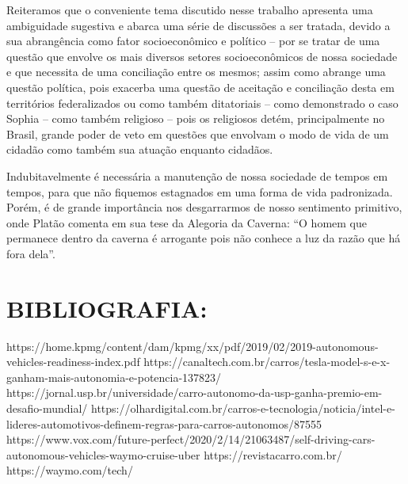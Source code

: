 \documentclass[a4paper, 12pt]{article}
\begin{document}
    Reiteramos que o conveniente tema discutido nesse trabalho apresenta uma ambiguidade sugestiva e abarca uma série de discussões a ser tratada, devido a sua abrangência como fator socioeconômico e político – por se tratar de uma questão que envolve os mais diversos setores socioeconômicos de nossa sociedade e que necessita de uma conciliação entre os mesmos; assim como abrange uma questão política, pois exacerba uma questão de aceitação e conciliação desta em territórios federalizados ou como também ditatoriais – como demonstrado o caso Sophia – como também religioso – pois os religiosos detém, principalmente no Brasil, grande poder de veto em questões que envolvam o modo de vida de um cidadão como também sua atuação enquanto cidadãos.
    
    Indubitavelmente é necessária a manutenção de nossa sociedade de tempos em tempos, para que não fiquemos estagnados em uma forma de vida padronizada. Porém, é de grande importância nos desgarrarmos de nosso sentimento primitivo, onde Platão comenta em sua tese da Alegoria da Caverna: “O homem que permanece dentro da caverna é arrogante pois não conhece a luz da razão que há fora dela”.
     \newpage
    \section{BIBLIOGRAFIA:}
    
    https://home.kpmg/content/dam/kpmg/xx/pdf/2019/02/2019-autonomous-vehicles-readiness-index.pdf
    https://canaltech.com.br/carros/tesla-model-s-e-x-ganham-mais-autonomia-e-potencia-137823/
    https://jornal.usp.br/universidade/carro-autonomo-da-usp-ganha-premio-em-desafio-mundial/
    https://olhardigital.com.br/carros-e-tecnologia/noticia/intel-e-lideres-automotivos-definem-regras-para-carros-autonomos/87555
    https://www.vox.com/future-perfect/2020/2/14/21063487/self-driving-cars-autonomous-vehicles-waymo-cruise-uber
    https://revistacarro.com.br/
    https://waymo.com/tech/
\end{document}
